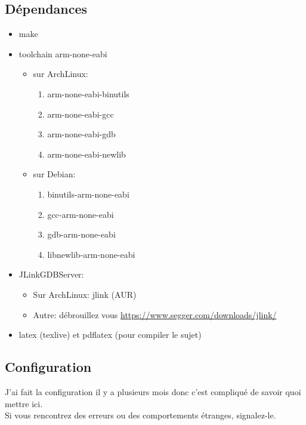 \documentclass[a4paper,10pt]{article} %
\begin{document}
\subsection{\label{dependances}Dépendances}
\begin{itemize}[label=$\bullet$]
    \item make
    \item toolchain arm-none-eabi
    \begin{itemize}
        \item sur ArchLinux:
        \begin{enumerate}
            \item arm-none-eabi-binutils
            \item arm-none-eabi-gcc
            \item arm-none-eabi-gdb
            \item arm-none-eabi-newlib
        \end{enumerate}
        \item sur Debian:
        \begin{enumerate}
            \item binutils-arm-none-eabi
            \item gcc-arm-none-eabi
            \item gdb-arm-none-eabi
            \item libnewlib-arm-none-eabi
        \end{enumerate}
    \end{itemize}
    \item JLinkGDBServer:
    \begin{itemize}
        \item Sur ArchLinux: jlink (AUR)
        \item Autre: débrouillez vous \href{https://www.segger.com/downloads/jlink/#J-LinkSoftwareAndDocumentationPack}{https://www.segger.com/downloads/jlink/}
    \end{itemize}
    \item latex (texlive) et pdflatex (pour compiler le sujet)
\end{itemize}

\subsection{Configuration}
J'ai fait la configuration il y a plusieurs mois donc c'est compliqué de savoir quoi mettre ici.\\

Si vous rencontrez des erreurs ou des comportements étranges, signalez-le.\\
\end{document}

